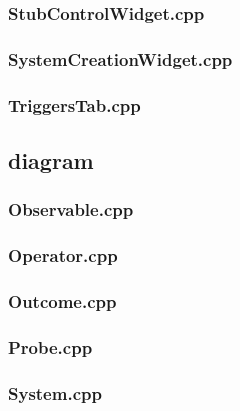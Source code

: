 \subsubsection*{StubControlWidget.cpp}


\subsubsection*{SystemCreationWidget.cpp}


\subsubsection*{TriggersTab.cpp}


\subsection*{diagram}

\subsubsection*{Observable.cpp}


\subsubsection*{Operator.cpp}


\subsubsection*{Outcome.cpp}


\subsubsection*{Probe.cpp}


\subsubsection*{System.cpp}


